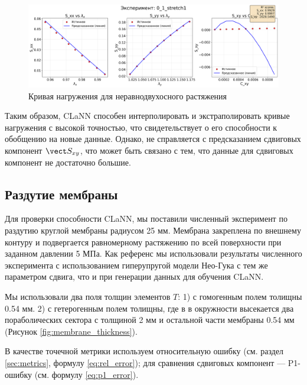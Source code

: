   \begin{figure}[H]
    \centering
    \includegraphics[width=1.0\textwidth]{img/extrapolation.png}
    \caption{Кривая нагружения для неравнодвухосного растяжения}
    \label{fig:extrapolation}
  \end{figure}
   
  Таким образом, CLaNN способен интерполировать и экстраполировать кривые нагружения с высокой точностью, что свидетельствует о его способности к обобщению на новые данные.
  Однако, не справляется с предсказанием сдвиговых компонент $\vect S_{xy}$, что может быть связано с тем, что данные для сдвиговых компонент не достаточно большие.
  
\subsection{Раздутие мембраны}

  Для проверки способности CLaNN, мы поставили численный эксперимент по раздутию круглой мембраны радиусом 25 мм.
  Мембрана закреплена по внешнему контуру и подвергается равномерному растяжению по всей поверхности при заданном давлении
  5 МПа. 
  Как референс мы использовали результаты численного эксперимента с использованием гиперупругой модели Нео-Гука с тем же параметром сдвига, 
  что и при генерации данных для обучения CLaNN.
  
  Мы использовали два поля толщин элементов $T$: 1) с гомогенным полем толищны 0.54 мм. 
  2) с гетерогенным полем толищны, где в в окружности высекается два пораболических сектора с толщиной 2 мм
  и остальной части мембраны 0.54 мм (Рисунок \ref{fig:membrane_thickness}). 

  В качестве точечной метрики используем относительную ошибку (см. раздел \ref{sec:metrics}, формулу \eqref{eq:rel_error});
  для сравнения сдвиговых компонент — P1-ошибку \cite{xie2024p1} (см. формулу \eqref{eq:p1_error}).

